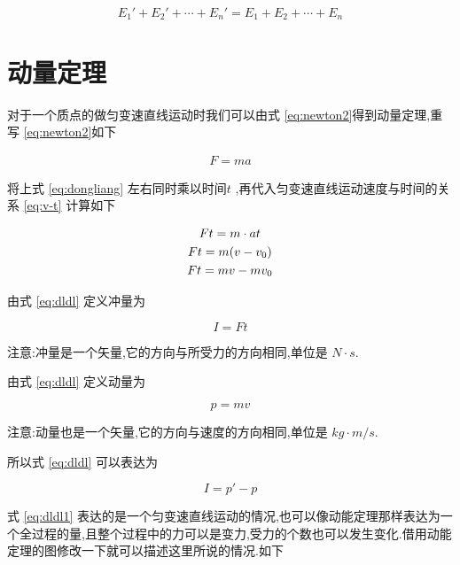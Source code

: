 \begin{equation}
  E_1'+E_2'+\cdots +E_n'=E_1+E_2+\cdots +E_n
  \label{eq:jxnshmulti}
\end{equation}

\section{动量定理}

对于一个质点的做匀变速直线运动时我们可以由式 \eqref{eq:newton2}得到动量定理,重写 \eqref{eq:newton2}如下

\begin{gather}
  F=ma
  \label{eq:dongliang}
\end{gather}

将上式 \eqref{eq:dongliang} 左右同时乘以时间$t$ ,再代入匀变速直线运动速度与时间的关系 \eqref{eq:v-t} 计算如下

\begin{gather}
  Ft=m\cdot at \notag\\
  Ft=m(v-v_0) \notag \\
  Ft=mv-mv_0
  \label{eq:dldl}
\end{gather}

由式 \eqref{eq:dldl} 定义冲量为 

\begin{equation}
  I=Ft
  \label{eq:chongliang}
\end{equation}

注意:冲量是一个矢量,它的方向与所受力的方向相同,单位是 $N\cdot s$.

由式 \eqref{eq:dldl} 定义动量为 

\begin{equation}
  p=mv
  \label{eq:dongliang1}
\end{equation}

注意:动量也是一个矢量,它的方向与速度的方向相同,单位是 $kg\cdot m/s$.

所以式 \eqref{eq:dldl} 可以表达为

\begin{equation}
  I=p'-p
  \label{eq:dldl1}
\end{equation}

式 \eqref{eq:dldl1} 表达的是一个匀变速直线运动的情况,也可以像动能定理那样表达为一个全过程的量,且整个过程中的力可以是变力,受力的个数也可以发生变化.借用动能定理的图修改一下就可以描述这里所说的情况.如下

